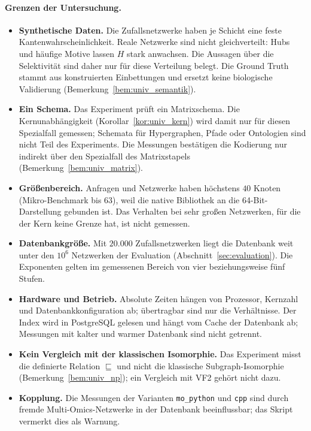 \paragraph{Grenzen der Untersuchung.}
\begin{itemize}
	\item \textbf{Synthetische Daten.} Die Zufallsnetzwerke haben je Schicht eine feste Kantenwahrscheinlichkeit. Reale Netzwerke sind nicht gleichverteilt: Hubs und häufige Motive lassen $H$ stark anwachsen. Die Aussagen über die Selektivität sind daher nur für diese Verteilung belegt. Die Ground Truth stammt aus konstruierten Einbettungen und ersetzt keine biologische Validierung (Bemerkung~\ref{bem:univ_semantik}).
	\item \textbf{Ein Schema.} Das Experiment prüft ein Matrixschema. Die Kernunabhängigkeit (Korollar~\ref{kor:univ_kern}) wird damit nur für diesen Spezialfall gemessen; Schemata für Hypergraphen, Pfade oder Ontologien sind nicht Teil des Experiments. Die Messungen bestätigen die Kodierung nur indirekt über den Spezialfall des Matrixstapels (Bemerkung~\ref{bem:univ_matrix}).
	\item \textbf{Größenbereich.} Anfragen und Netzwerke haben höchstens $40$ Knoten (Mikro-Benchmark bis $63$), weil die native Bibliothek an die 64-Bit-Darstellung gebunden ist. Das Verhalten bei sehr großen Netzwerken, für die der Kern keine Grenze hat, ist nicht gemessen.
	\item \textbf{Datenbankgröße.} Mit $20.000$ Zufallsnetzwerken liegt die Datenbank weit unter den $10^6$ Netzwerken der Evaluation (Abschnitt~\ref{sec:evaluation}). Die Exponenten gelten im gemessenen Bereich von vier beziehungsweise fünf Stufen.
	\item \textbf{Hardware und Betrieb.} Absolute Zeiten hängen von Prozessor, Kernzahl und Datenbankkonfiguration ab; übertragbar sind nur die Verhältnisse. Der Index wird in PostgreSQL gelesen und hängt vom Cache der Datenbank ab; Messungen mit kalter und warmer Datenbank sind nicht getrennt.
	\item \textbf{Kein Vergleich mit der klassischen Isomorphie.} Das Experiment misst die definierte Relation $\sqsubseteq$ und nicht die klassische Subgraph-Isomorphie (Bemerkung~\ref{bem:univ_np}); ein Vergleich mit VF2 gehört nicht dazu.
	\item \textbf{Kopplung.} Die Messungen der Varianten \texttt{mo\_python} und \texttt{cpp} sind durch fremde Multi-Omics-Netzwerke in der Datenbank beeinflussbar; das Skript vermerkt dies als Warnung.
\end{itemize}

